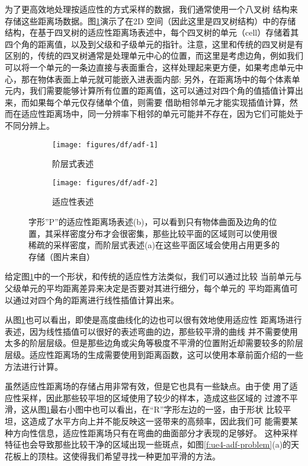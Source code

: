 为了更高效地处理按适应性的方式采样的数据，我们通常使用一个八叉树 结构来存储这些距离场数据。图\ref{f:df-adf}演示了在2D 空间（因此这里是四叉树结构）中的存储结构，在基于四叉树的适应性距离场表述中，每个四叉树的单元（cell）存储着其四个角的距离值，以及到父级和子级单元的指针。注意，这里和传统的四叉树是有区别的，传统的四叉树通常是处理单元中心的位置，而这里是考虑边角，例如我们可以将一个单元的一条边直接与表面重合，这样处理起来更方便，如果考虑单元中心，那在物体表面上单元就可能嵌入进表面内部; 另外，在距离场中的每个体素单元内，我们需要能够计算所有位置的距离值，这可以通过对四个角的值插值计算出来，而如果每个单元仅存储单个值，则需要 借助相邻单元才能实现插值计算，然而在适应性距离场中，同一分辨率下相邻的单元可能并不存在，因为它们可能处于不同分辨上。

\begin{figure}
\begin{fullwidth}
	\begin{subfigure}[b]{0.5\thewidth}
		\texttt{[image: figures/df/adf-1]}
		\caption{阶层式表述}
	\end{subfigure}
	\begin{subfigure}[b]{0.5\thewidth}
		\texttt{[image: figures/df/adf-2]}
		\caption{适应性表述}
	\end{subfigure}
	\caption{字形”P”的适应性距离场表述(b)，可以看到只有物体曲面及边角的位置，其采样密度分布才会很密集，那些比较平面的区域则可以使用很稀疏的采样密度，而阶层式表述(a)在这些平面区域会使用占用更多的存储（图片来自\cite{a:adf}）}
	\label{f:df-adf}
\end{fullwidth}
\end{figure}

给定图\ref{f:df-adf}中的一个形状，和传统的适应性方法类似，我们可以通过比较 当前单元与父级单元的平均距离差异来决定是否要对其进行细分，每个单元的 平均距离值可以通过对四个角的距离进行线性插值计算出来。

从图\ref{f:df-adf}也可以看出，即使是高度曲线化的边也可以很有效地使用适应性 距离场进行表述，因为线性插值可以很好的表述弯曲的边，那些较平滑的曲线 并不需要使用太多的阶层层级。但是那些边角或尖角等极度不平滑的位置附近却需要较多的阶层层级。适应性距离场的生成需要使用到距离函数，这可以使用本章前面介绍的一些方法进行计算。

虽然适应性距离场的存储占用非常有效，但是它也具有一些缺点。由于使 用了适应性采样，因此那些较平坦的区域使用了较少的样本，造成这些区域的 过渡不平滑，这从图\ref{f:df-adf}最右小图中也可以看出，在“R”字形左边的一竖，由于形状 比较平坦，这造成了水平方向上并不能反映这一竖带来的高频率，因此我们可 能需要某种方向性信息，适应性距离场只有在弯曲的曲面部分才表现的足够好。 这种采样特征也会导致那些比较干净的区域出现一些斑点，如图\ref{f:ue4-adf-problem}(a)的天花板上的顶柱。这使得我们希望寻找一种更加平滑的方法。

